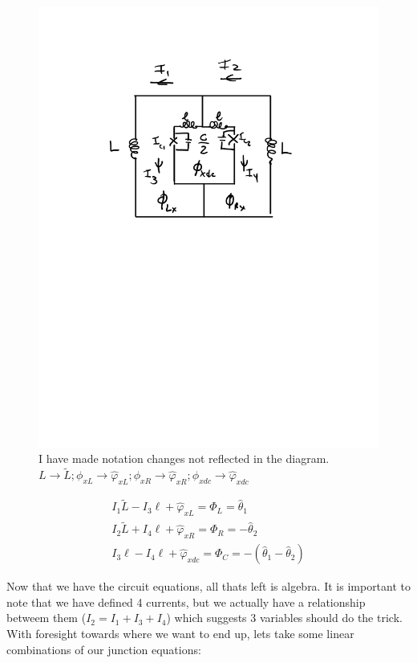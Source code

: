 \documentclass[paper=a4, twocolumn, fontsize=10pt]{article} %
\numberwithin{equation}{section} %
\numberwithin{figure}{section} %
\numberwithin{table}{section} %
\def \df#1{\hat{#1}}
\begin{document}
\begin{figure}[H]
\centering
\includegraphics[scale=.5]{circuit_diagram.pdf}
\caption{I have made notation changes not reflected in the diagram. $L \to \tilde{L}; \phi_{xL} \to \df\varphi_{xL}; \phi_{xR} \to \df\varphi_{xR};  \phi_{xdc} \to \df\varphi_{xdc}  $
}
\end{figure}

\begin{align}
    I_1 \tilde{L} - I_3 \ell + \df\varphi_{xL} = \Phi_{L} = \df\theta_1
    \\
    I_2 \tilde{L} + I_4 \ell + \df\varphi_{xR} = \Phi_{R} = -\df\theta_2
    \\
    I_3 \ell - I_4 \ell + \df\varphi_{xdc} = \Phi_{C} = -(\df\theta_1 - \df\theta_2)
\end{align} 

Now that we have the circuit equations, all thats left is algebra. It is important to note that we have defined 4 currents, but we actually have a relationship betweem them ($I_2 = I_1 + I_3 + I_4$) which suggests 3 variables should do the trick. With foresight towards where we want to end up, lets take some linear combinations of our junction equations:
\end{document}
